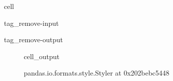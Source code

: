 \documentclass[letterpaper,10pt,english]{jupyterBook}
\begin{document}
\begin{sphinxuseclass}{cell}
\begin{sphinxuseclass}{tag_remove-input}
\begin{sphinxuseclass}{tag_remove-output}
\end{sphinxuseclass}
\end{sphinxuseclass}
\end{sphinxuseclass}
\begin{figure}[htbp]
\centering
\capstart
\begin{sphinxVerbatimOutput}

\begin{sphinxuseclass}{cell_output}
\begin{sphinxVerbatim}[commandchars=\\\{\}]
\PYGZlt{}pandas.io.formats.style.Styler at 0x202bebc5448\PYGZgt{}
\end{sphinxVerbatim}

\end{sphinxuseclass}\end{sphinxVerbatimOutput}
\caption{}\label{\detokenize{AppendixB:table16}}\end{figure}
\end{document}
